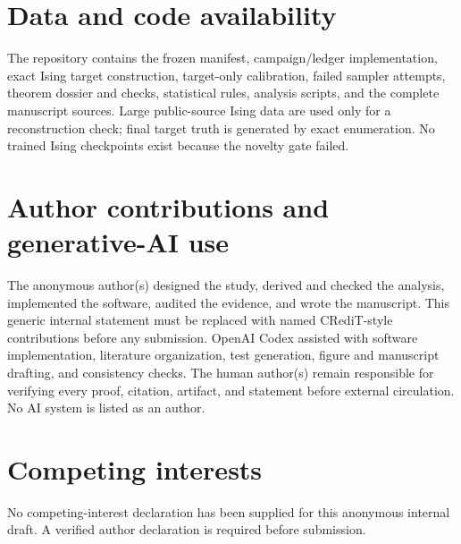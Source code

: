\documentclass[a4paper,twocolumn,11pt,unpublished]{quantumarticle}
\begin{document}
\section*{Data and code availability}
The repository contains the frozen manifest, campaign/ledger implementation,
exact Ising target construction, target-only calibration, failed sampler
attempts, theorem dossier and checks, statistical rules, analysis scripts, and
the complete manuscript sources. Large public-source Ising data are used only
for a reconstruction check; final target truth is generated by exact
enumeration. No trained Ising checkpoints exist because the novelty gate
failed.

\section*{Author contributions and generative-AI use}
The anonymous author(s) designed the study, derived and checked the analysis,
implemented the software, audited the evidence, and wrote the manuscript. This
generic internal statement must be replaced with named CRediT-style
contributions before any submission.
OpenAI Codex assisted with software implementation, literature organization,
test generation, figure and manuscript drafting, and consistency checks. The
human author(s) remain responsible for verifying every proof, citation,
artifact, and statement before external circulation. No AI system is listed as
an author.

\section*{Competing interests}
No competing-interest declaration has been supplied for this anonymous
internal draft. A verified author declaration is required before submission.

\footnotesize


\end{document}

